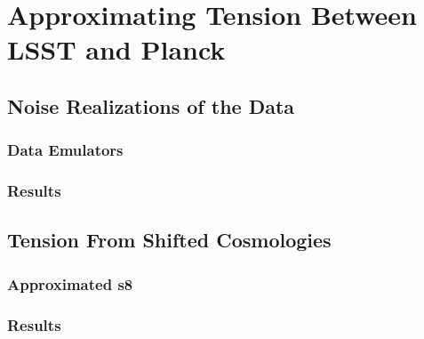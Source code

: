 \chapter{Approximating Tension Between LSST and Planck}
\section{Noise Realizations of the Data}
\subsection{Data Emulators}
\subsection{Results}
\section{Tension From Shifted Cosmologies}
\subsection{Approximated s8}
\subsection{Results}